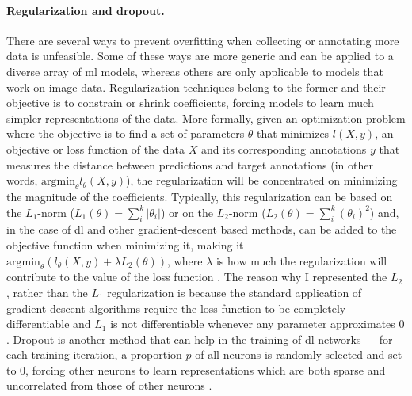 \paragraph{Regularization and dropout.} There are several ways to prevent overfitting when collecting or annotating more data is unfeasible. Some of these ways are more generic and can be applied to a diverse array of \ac{ml} models, whereas others are only applicable to models that work on image data. Regularization techniques belong to the former and their objective is to constrain or shrink coefficients, forcing models to learn much simpler representations of the data. More formally, given an optimization problem where the objective is to find a set of parameters $\theta$ that minimizes $l(X,y)$, an objective or loss function of the data $X$ and its corresponding annotations $y$ that measures the distance between predictions and target annotations (in other words, $\mathrm{arg min}_{\theta}l_{\theta}(X,y)$), the regularization will be concentrated on minimizing the magnitude of the coefficients. Typically, this regularization can be based on the $L_1$-norm ($L_1(\theta) = \sum_i^k{|\theta_i|}$) or on the $L_2$-norm ($L_2(\theta) = \sum_i^k{(\theta_i)^2}$) and, in the case of \ac{dl} and other gradient-descent based methods, can be added to the objective function when minimizing it, making it $\mathrm{arg min}_{\theta}(l_{\theta}(X,y)+\lambda L_2(\theta))$, where $\lambda$ is how much the regularization will contribute to the value of the loss function \cite{James2013-py}. The reason why I represented the $L_2$, rather than the $L_1$ regularization is because the standard application of gradient-descent algorithms require the loss function to be completely differentiable and $L_1$ is not differentiable whenever any parameter approximates $0$. Dropout is another method that can help in the training of \ac{dl} networks --- for each training iteration, a proportion $p$ of all neurons is randomly selected and set to $0$, forcing other neurons to learn representations which are both sparse and uncorrelated from those of other neurons \cite{Srivastava2014a}. 

